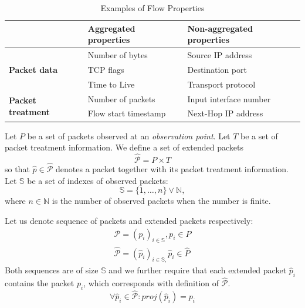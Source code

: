 \begin{table}[ht!]
	\centering
	\begin{tabular}{lll}
	\toprule
	                                           & \textbf{Aggregated properties}  & \textbf{Non-aggregated properties}  \\ \midrule
	\multirow{3}{*}{\textbf{Packet data}}      & Number of bytes                 & Source IP address                   \\ 
	                                           & TCP flags                       & Destination port                    \\ 
	                                           & Time to Live                    & Transport protocol                  \\ \midrule
	\multirow{2}{*}{\textbf{Packet treatment}} & Number of packets               & Input interface number              \\ 
	                                           & Flow start timestamp            & Next-Hop IP address                 \\ \bottomrule
	\end{tabular}
	\caption{Examples of Flow Properties}
	\label{tab:flow.properties}
\end{table}



Let $P$ be a set of packets observed at an \emph{observation point}. Let $T$ be a set of packet treatment information. We define a set of extended packets
\begin{equation*}
	\widehat{\mathcal{P}} = P\times T
\end{equation*}
so that $\widehat{p} \in \widehat{\mathcal{P}}$ denotes a packet together with its packet treatment information. Let $\mathbb{S}$ be a set of indexes of observed packets:
\begin{equation*}
	\mathbb{S} = \{1, \ldots, n\} \lor \mathbb{N},
\end{equation*}
where $n \in \mathbb{N}$ is the number of observed packets when the number is finite.

Let us denote sequence of packets and extended packets respectively:
\begin{align*}
	\mathcal{P} = (p_i)_{i \in \mathbb{S}}, p_i \in P\\
	\widehat{\mathcal{P}} = (\widehat{p}_i)_{i \in \mathbb{S},} \widehat{p}_i \in \widehat{P}
\end{align*}
Both sequences are of size $\mathbb{S}$ and we further require that each extended packet $\widehat{p}_i$ contains the packet $p_i$, which corresponds with definition of $\widehat{\mathcal{P}}$.
\begin{equation*}
	\forall \widehat{p}_i \in \widehat{\mathcal{P}}: proj(\widehat{p}_i) = p_i
\end{equation*}


